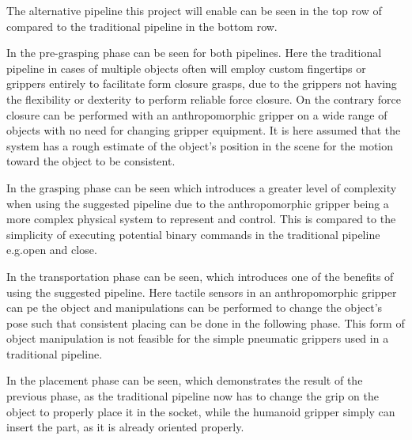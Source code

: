 The alternative pipeline this project will enable can be seen in the top row of  compared to the traditional pipeline in the bottom row.\medskip 

In  the pre-grasping phase can be seen for both pipelines. Here the traditional pipeline in cases of multiple objects often will employ custom fingertips or grippers entirely to facilitate form closure grasps, due to the grippers not having the flexibility or dexterity to perform reliable force closure. On the contrary force closure can be performed with an anthropomorphic gripper on a wide range of objects with no need for changing gripper equipment. It is here assumed that the system has a rough estimate of the object's position in the scene for the motion toward the object to be consistent.\medskip

In  the grasping phase can be seen which introduces a greater level of complexity when using the suggested pipeline due to the anthropomorphic gripper being a more complex physical system to represent and control. This is compared to the simplicity of executing potential binary commands in the traditional pipeline e.g.open and close. \medskip

In  the transportation phase can be seen, which introduces one of the benefits of using the suggested pipeline. Here tactile sensors in an anthropomorphic gripper can \gls{pe} the object and manipulations can be performed to change the object's pose such that consistent placing can be done in the following phase. This form of object manipulation is not feasible for the simple pneumatic grippers used in a traditional pipeline. \medskip

In  the placement phase can be seen, which demonstrates the result of the previous phase, as the traditional pipeline now has to change the grip on the object to properly place it in the socket, while the humanoid gripper simply can insert the part, as it is already oriented properly. \medskip

\newpage

